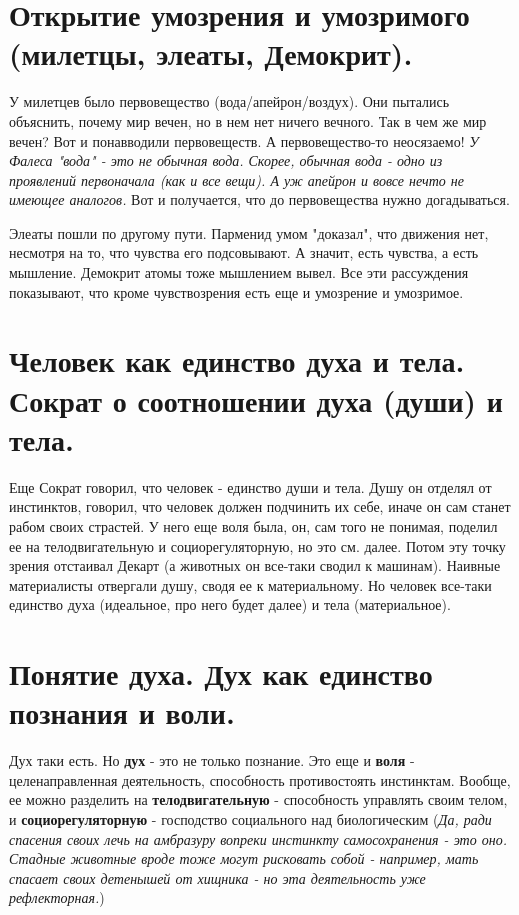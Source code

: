 \section{ Открытие умозрения и умозримого (милетцы, элеаты, Демокрит).}
У милетцев было первовещество (вода/апейрон/воздух). Они пытались объяснить, почему мир вечен, но в нем нет ничего вечного. Так в чем же мир вечен? Вот и понавводили первовеществ. А первовещество-то неосязаемо! \textit{У Фалеса "вода" - это не обычная вода. Скорее, обычная вода - одно из проявлений первоначала (как и все вещи). А уж апейрон и вовсе нечто не имеющее аналогов.} Вот и получается, что до первовещества нужно догадываться.

Элеаты пошли по другому пути. Парменид умом "доказал", что движения нет, несмотря на то, что чувства его подсовывают. А значит, есть чувства, а есть мышление. Демокрит атомы тоже мышлением вывел. Все эти рассуждения показывают, что кроме чувствозрения есть еще и умозрение и умозримое.

\section{ Человек как единство духа и тела. Сократ о соотношении духа (души) и тела.}
Еще Сократ говорил, что человек - единство души и тела. Душу он отделял от инстинктов, говорил, что человек должен подчинить их себе, иначе он сам станет рабом своих страстей. У него еще воля была, он, сам того не понимая, поделил ее на телодвигательную и социорегуляторную, но это см. далее. Потом эту точку зрения отстаивал Декарт (а животных он все-таки сводил к машинам). Наивные материалисты отвергали душу, сводя ее к материальному. Но человек все-таки единство духа (идеальное, про него будет далее) и тела (материальное). 

\section{ Понятие духа. Дух как единство познания и воли.}
Дух таки есть. Но \textbf{дух} - это не только познание. Это еще и \textbf{воля} - целенаправленная деятельность, способность противостоять инстинктам. Вообще, ее можно разделить на \textbf{телодвигательную} - способность управлять своим телом, и \textbf{социорегуляторную} - господство социального над биологическим (\textit{Да, ради спасения своих лечь на амбразуру вопреки инстинкту самосохранения - это оно. Стадные животные вроде тоже могут рисковать собой - например, мать спасает своих детенышей от хищника - но эта деятельность уже рефлекторная.})

